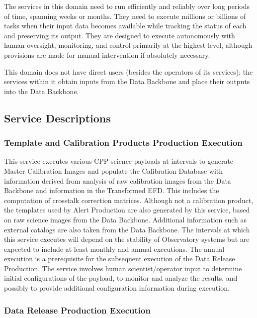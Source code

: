 \documentclass[]{article}
\begin{document}
The services in this domain need to run efficiently and reliably over
long periods of time, spanning weeks or months. They need to execute
millions or billions of tasks when their input data becomes available
while tracking the status of each and preserving its output. They are
designed to execute autonomously with human oversight, monitoring, and
control primarily at the highest level, although provisions are made for
manual intervention if absolutely necessary.

This domain does not have direct users (besides the operators of its
services); the services within it obtain inputs from the Data Backbone
and place their outputs into the Data Backbone.

\subsection{Service Descriptions}\label{service-descriptions-2}

\subsubsection{Template and Calibration Products Production
Execution}\label{template-and-calibration-products-production-execution}

This service executes various CPP science payloads at intervals to
generate Master Calibration Images and populate the Calibration Database
with information derived from analysis of raw calibration images from
the Data Backbone and information in the Transformed EFD. This includes
the computation of crosstalk correction matrices. Although not a
calibration product, the templates used by Alert Production are also
generated by this service, based on raw science images from the Data
Backbone. Additional information such as external catalogs are also
taken from the Data Backbone. The intervals at which this service
executes will depend on the stability of Observatory systems but are
expected to include at least monthly and annual executions. The annual
execution is a prerequisite for the subsequent execution of the Data
Release Production. The service involves human scientist/operator input
to determine initial configurations of the payload, to monitor and
analyze the results, and possibly to provide additional configuration
information during execution.

\subsubsection{Data Release Production
Execution}\label{data-release-production-execution}
\end{document}

